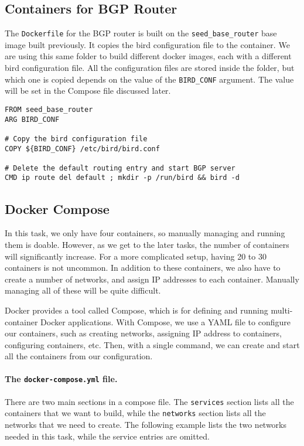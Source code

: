 \subsection{Containers for BGP Router}

The \texttt{Dockerfile} for the BGP router is built 
on the \texttt{seed\_base\_router} base image built previously.  
It copies the bird configuration file to the container.
We are using this same folder to build different 
docker images, each with a different bird configuration file.
All the configuration files are stored inside the folder,
but which one is copied depends on the value 
of the \texttt{BIRD\_CONF} argument. The value will be set 
in the Compose file discussed later.  

\begin{lstlisting}
FROM seed_base_router
ARG BIRD_CONF

# Copy the bird configuration file
COPY ${BIRD_CONF} /etc/bird/bird.conf

# Delete the default routing entry and start BGP server
CMD ip route del default ; mkdir -p /run/bird && bird -d
\end{lstlisting}


\subsection{Docker Compose} 

In this task, we only have four containers, so manually
managing and running them is doable. However, as we 
get to the later tasks, the number of containers will
significantly increase. For a more complicated
setup, having 20 to 30 containers is not uncommon. 
In addition to these containers, we also have to create 
a number of networks, and assign IP addresses to each container.
Manually managing all of these will be quite difficult.

Docker provides a tool called Compose, which
is for defining and running multi-container Docker applications.
With Compose, we use a YAML file to configure our containers, such as
creating networks, assigning IP address to containers, 
configuring containers, etc. 
Then, with a single command,
we can create and start all the containers from our configuration.


\paragraph{The \texttt{docker-compose.yml} file.}
There are two main sections in a compose file. 
The \texttt{services} section lists all the 
containers that we want to build, while  
the \texttt{networks} section lists 
all the networks that we need to create. 
The following example lists the two
networks needed in this task, while the service entries are 
omitted. 

